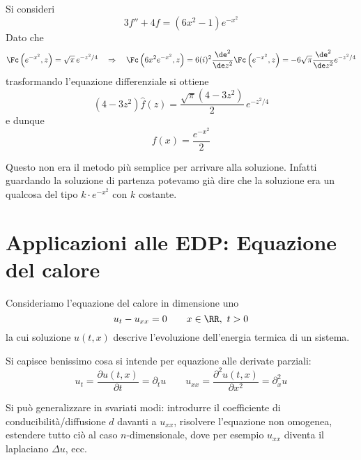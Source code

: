 \begin{exa}
Si consideri
\begin{equation*}
3f''+4f=(6x^2-1)e^{-x^2}
\end{equation*}
Dato che
\begin{equation*}
\Fc\left(e^{-x^2},z\right)=\sqrt{\pi}\,e^{-z^2/4 }\quad\Rightarrow\quad\Fc\left(6x^2e^{-x^2},z\right)=6(i)^2\frac{\de^2}{\de z^2}\Fc\left(e^{-x^2},z\right)=-6\sqrt{\pi}\frac{\de^2}{\de z^2}e^{-z^2/4}
\end{equation*}
trasformando l'equazione differenziale si ottiene
\begin{equation*}
(4-3z^2)\hat{f}(z)=\frac{\sqrt{\pi}(4-3z^2)}{2}\,e^{-z^2/4}
\end{equation*}
e dunque 
\begin{equation*}
f(x)=\frac{e^{-x^2}}{2}
\end{equation*}
\begin{rem}
Questo non era il metodo più semplice per arrivare alla soluzione. Infatti guardando la soluzione di partenza potevamo già dire che la soluzione era un qualcosa del tipo $k\cdot e^{-x^2}$ con $k$ costante.
\end{rem}

\end{exa}


\section{Applicazioni alle EDP: Equazione del calore}

Consideriamo l'equazione del calore in dimensione uno
\begin{equation*}
u_{t} - u_{xx} = 0\qquad x\in\RR,\ t>0
\end{equation*}
la cui soluzione $u(t,x)$ descrive l'evoluzione dell'energia termica di un sistema.

Si capisce benissimo cosa si intende per equazione alle derivate parziali:
\begin{equation*}
u_t=\frac{\partial u(t,x)}{\partial t}=\partial_t u\qquad u_{xx}=\frac{\partial^2 u(t,x)}{\partial x^2}=\partial^2_{x} u
\end{equation*}

\begin{rem}
Si può generalizzare in svariati modi: introdurre il coefficiente di conducibilità/diffusione $d$ davanti a $u_{xx}$, risolvere l'equazione non omogenea, estendere tutto ciò al caso $n$-dimensionale, dove per esempio $u_{xx}$ diventa il laplaciano $\Delta u$, ecc.
\end{rem}

